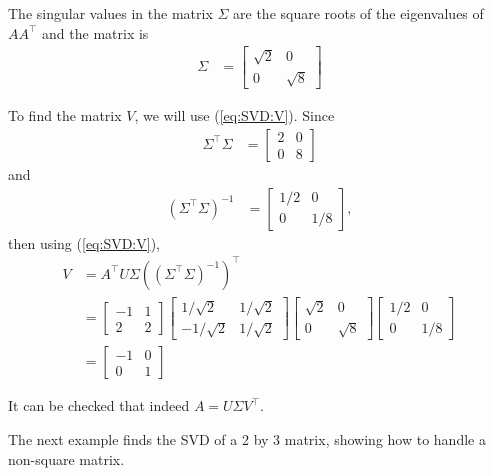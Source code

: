 \begin{example}
The singular values in the matrix $\Sigma$ are the square roots of the eigenvalues of $AA^{\intercal}$ and the matrix is
\begin{align*}
\Sigma & = \begin{bmatrix}
\sqrt{2} & 0 \\
0 & \sqrt{8} 
\end{bmatrix}
\end{align*}


To find the matrix $V$, we will use (\ref{eq:SVD:V}).  Since
\begin{align*}
\Sigma^{\intercal} \Sigma & = \begin{bmatrix}
2 & 0 \\
0 & 8 
\end{bmatrix}
\end{align*}
and 
\begin{align*}
(\Sigma^{\intercal} \Sigma)^{-1} & = \begin{bmatrix}
1/2 & 0 \\
0 & 1/8 
\end{bmatrix},
\end{align*}
then using (\ref{eq:SVD:V}),
\begin{align*}
V & = A^{\intercal} U \Sigma ((\Sigma^{\intercal} \Sigma)^{-1})^{\intercal} \\
& = \begin{bmatrix}
-1 & 1 \\
2 & 2 
\end{bmatrix}
\begin{bmatrix}
1/\sqrt{2} & 1/\sqrt{2} \\
-1/\sqrt{2} & 1/\sqrt{2}
\end{bmatrix}
\begin{bmatrix}
\sqrt{2} & 0 \\
0 & \sqrt{8} 
\end{bmatrix}
\begin{bmatrix}
1/2 & 0 \\
0 & 1/8 
\end{bmatrix} \\
& = \begin{bmatrix}
-1 & 0 \\ 0 & 1
\end{bmatrix}
\end{align*}


It can be checked that indeed $A=U\Sigma V^{\intercal}$.  
\end{example}


The next example finds the SVD of a 2 by 3 matrix, showing how to handle a non-square matrix. 

